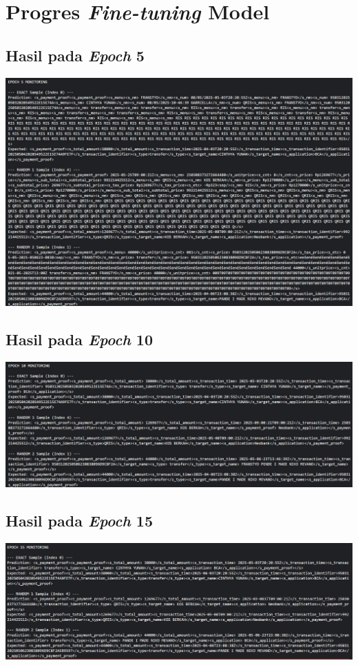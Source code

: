 \chapter{Progres \emph{Fine-tuning} Model \donut{}}
\label{chap:progress-fine-tuning}

\section{Hasil pada \emph{Epoch} 5}
\includegraphics[width=1\textwidth]{images/epoch/epoch-5.jpg}

\section{Hasil pada \emph{Epoch} 10}
\includegraphics[width=1\textwidth]{images/epoch/epoch-10.jpg}

\section{Hasil pada \emph{Epoch} 15}
\includegraphics[width=1\textwidth]{images/epoch/epoch-15.jpg}

